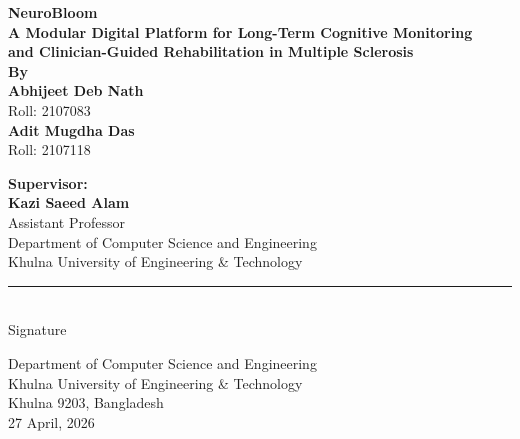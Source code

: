 \documentclass[12pt,a4paper]{report}
\begin{document}
\begin{titlepage}
\begin{center}

\vspace*{0.7cm}

{\Large\textbf{NeuroBloom}}\\[0.3cm]

{\large\textbf{A Modular Digital Platform for Long-Term Cognitive Monitoring}}\\
{\large\textbf{and Clinician-Guided Rehabilitation in Multiple Sclerosis}}\\[1.2cm]

{\large\textbf{By}}\\[0.8cm]

{\large\textbf{Abhijeet Deb Nath}}\\
Roll: 2107083\\[0.5cm]

{\large\textbf{Adit Mugdha Das}}\\
Roll: 2107118\\[2cm]

\begin{flushleft}
\textbf{Supervisor:}\\[0.3cm]

\hspace{1.2cm}\textbf{Kazi Saeed Alam}\\
\hspace{1.2cm}Assistant Professor\\
\hspace{1.2cm}Department of Computer Science and Engineering\\
\hspace{1.2cm}Khulna University of Engineering \& Technology
\end{flushleft}

\vspace{0.5cm}

\begin{flushright}
\rule{4cm}{0.4pt}\\
Signature
\end{flushright}

\vfill

{\small Department of Computer Science and Engineering}\\
{\small Khulna University of Engineering \& Technology}\\
{\small Khulna 9203, Bangladesh}\\
{\small 27 April, 2026}

\end{center}
\end{titlepage}
\end{document}
